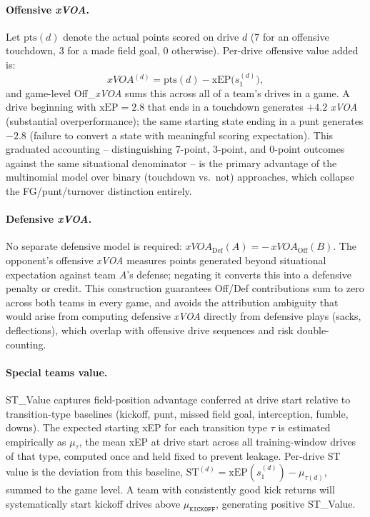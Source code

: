 \documentclass[12pt,a4paper]{article}
\newcommand{\xvoa}{\textit{xVOA}}
\begin{document}
\paragraph{Offensive \xvoa{}.} Let $\text{pts}(d)$ denote the actual points scored on drive $d$ (7 for an offensive touchdown, 3 for a made field goal, 0 otherwise). Per-drive offensive value added is:
\begin{equation}
  \label{eq:xvoa-drive}
  \xvoa{}^{(d)} = \mathrm{pts}(d) - \mathrm{xEP}\!\bigl(s_1^{(d)}\bigr),
\end{equation}
and game-level Off\_\xvoa{} sums this across all of a team's drives in a game. A drive beginning with $\text{xEP} = 2.8$ that ends in a touchdown generates $+4.2$ \xvoa{} (substantial overperformance); the same starting state ending in a punt generates $-2.8$ (failure to convert a state with meaningful scoring expectation). This graduated accounting -- distinguishing 7-point, 3-point, and 0-point outcomes against the same situational denominator -- is the primary advantage of the multinomial model over binary (touchdown vs.\ not) approaches, which collapse the FG/punt/turnover distinction entirely.

\paragraph{Defensive \xvoa{}.} No separate defensive model is required: $\xvoa{}_{\mathrm{Def}}(A) = -\,\xvoa{}_{\mathrm{Off}}(B)$. The opponent's offensive \xvoa{} measures points generated beyond situational expectation against team $A$'s defense; negating it converts this into a defensive penalty or credit. This construction guarantees Off/Def contributions sum to zero across both teams in every game, and avoids the attribution ambiguity that would arise from computing defensive \xvoa{} directly from defensive plays (sacks, deflections), which overlap with offensive drive sequences and risk double-counting.

\paragraph{Special teams value.} ST\_Value captures field-position advantage conferred at drive start relative to transition-type baselines (kickoff, punt, missed field goal, interception, fumble, downs). The expected starting xEP for each transition type $\tau$ is estimated empirically as $\mu_{\tau}$, the mean xEP at drive start across all training-window drives of that type, computed once and held fixed to prevent leakage. Per-drive ST value is the deviation from this baseline, $\mathrm{ST}^{(d)} = \mathrm{xEP}(s_1^{(d)}) - \mu_{\tau(d)}$, summed to the game level. A team with consistently good kick returns will systematically start kickoff drives above $\mu_{\texttt{KICKOFF}}$, generating positive ST\_Value.
\end{document}
